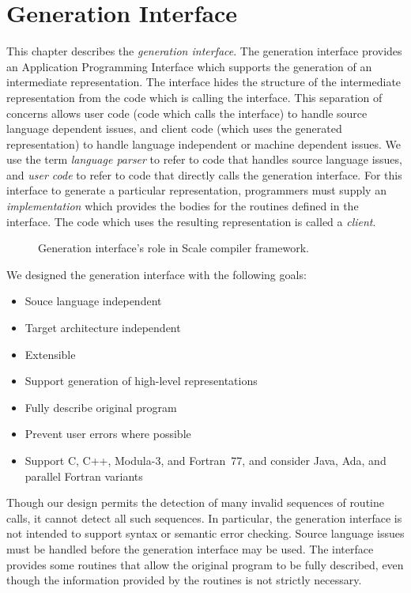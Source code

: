 
\chapter{Generation Interface}\label{chap:genIf}

This chapter describes the \textit{generation interface}.  The
generation interface provides an Application Programming Interface
which supports the generation of an intermediate representation.  The
interface hides the structure of the intermediate representation from
the code which is calling the interface.  This separation of concerns
allows user code (code which calls the interface) to handle source
language dependent issues, and client code (which uses the generated
representation) to handle language independent or machine dependent
issues.  We use the term \emph{language parser} to refer to code that
handles source language issues, and \emph{user code} to refer to code
that directly calls the generation interface.  For this interface to
generate a particular representation, programmers must supply an
\emph{implementation} which provides the bodies for the
routines defined in the interface.  The code which uses the
resulting representation is called a \emph{client}.

\begin{figure}
  \centering
\caption{\label{fig:ifRole} Generation interface's role in Scale
compiler framework.}
\end{figure}

We designed the generation interface with the following goals:
\begin{itemize}
\item Souce language independent
\item Target architecture independent
\item Extensible
\item Support generation of high-level representations 
\item Fully describe original program
\item Prevent user errors where possible
\item Support C, C++, Modula-3, and Fortran~77, and consider
Java, Ada, and parallel Fortran variants
\end{itemize}
Though our design permits the detection of many invalid sequences of
routine calls, it cannot detect all such sequences.  In particular, the
generation interface is not intended to support syntax or semantic
error checking.  Source language issues must be handled before the
generation interface may be used.  The interface provides some
routines that allow the original program to be fully described, even
though the information provided by the routines is not strictly
necessary.  

